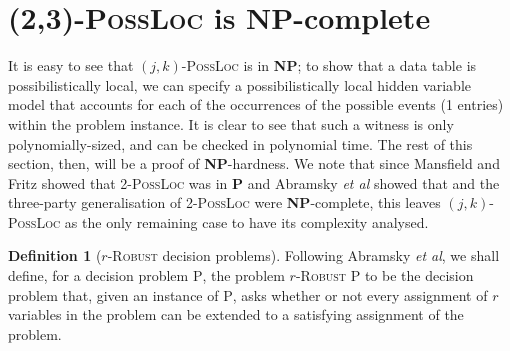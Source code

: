 \documentclass[reprint]{revtex4-1}
\theoremstyle{definition}
\newtheorem{defn}{Definition}
\begin{document}
\section{\textsc{(2,3)-PossLoc} is \textbf{NP}-complete}


It is easy to see that $(j,k)$-\textsc{PossLoc} is in \textbf{NP}; to show that a data table is possibilistically local, we can specify a possibilistically local hidden variable model that accounts for each of the occurrences of the possible events (1 entries) within the problem instance. It is clear to see that such a witness is only polynomially-sized, and can be checked in polynomial time. The rest of this section, then, will be a proof of \textbf{NP}-hardness. We note that since Mansfield and Fritz \cite{Mans2011} showed that \textsc{2-PossLoc} was in \textbf{P} and Abramsky \emph{et al} showed that   and the three-party generalisation of \textsc{2-PossLoc} were \textbf{NP}-complete, this leaves $(j,k)$-\textsc{PossLoc} as the only remaining case to have its complexity analysed.

\begin{defn}[$r$-\textsc{Robust} decision problems]	
Following Abramsky \emph{et al}, we shall define, for a decision problem \textsc{P}, the problem $r$-\textsc{Robust P} to be the decision problem that, given an instance of \textsc{P}, asks whether or not every assignment of $r$ variables in the problem can be extended to a satisfying assignment of the problem.
\end{defn}
\end{document}
